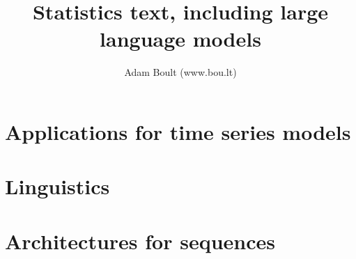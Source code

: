 \documentclass[oneside]{book}
\begin{document}
\author{Adam Boult (www.bou.lt)}
\title{Statistics text, including large language models}
\maketitle

\setcounter{tocdepth}{0}
\tableofcontents



\part{Applications for time series models}





\part{Linguistics}




\part{Architectures for sequences}



\end{document}
